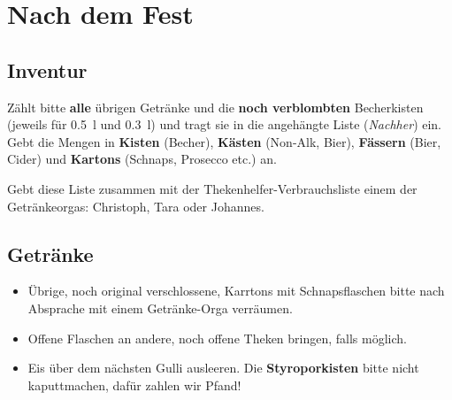 \section{Nach dem Fest}
\subsection{Inventur}
Zählt bitte \textbf{alle} übrigen Getränke und die \textbf{noch verblombten} Becherkisten (jeweils für \SI{0.5}{\litre} und \SI{0.3}{\litre}) und tragt sie in die angehängte Liste (\emph{Nachher}) ein. Gebt die Mengen in \textbf{Kisten} (Becher), \textbf{Kästen} (Non-Alk, Bier), \textbf{Fässern} (Bier, Cider) und \textbf{Kartons} (Schnaps, Prosecco etc.) an.

Gebt diese Liste zusammen mit der Thekenhelfer-Verbrauchsliste einem der Getränkeorgas: Christoph, Tara oder Johannes.
\subsection{Getränke}
\begin{itemize}
  \item Übrige, noch original verschlossene, Karrtons mit Schnapsflaschen bitte nach Absprache mit einem Getränke-Orga verräumen.
  \item Offene Flaschen an andere, noch offene Theken bringen, falls möglich.
  \item Eis über dem nächsten Gulli ausleeren. Die \textbf{Styroporkisten} bitte nicht kaputtmachen, dafür zahlen wir Pfand!
\end{itemize}

